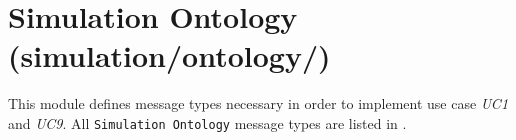 \section{Simulation Ontology (simulation/ontology/)}
\label{Chapters/Implementation/Simulation-Ontology}
This module defines message types necessary in order to implement use case \textit{UC1} and \textit{UC9}. All \texttt{Simulation Ontology} message types are listed in .